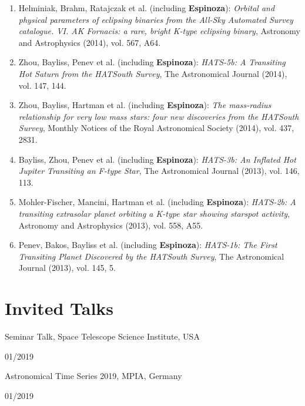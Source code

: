\documentclass[12pt, a4paper]{article} %
\begin{document}
\begin{flushleft}
\begin{enumerate}
\item Helminiak, Brahm, Ratajczak et al. (including \textbf{Espinoza}): \textit{Orbital and physical parameters of eclipsing binaries from the All-Sky Automated Survey catalogue. VI. AK Fornacis: a rare, bright K-type eclipsing binary}, Astronomy and Astrophysics (2014), vol. 567, A64.
\item Zhou, Bayliss, Penev et al. (including \textbf{Espinoza}): \textit{HATS-5b: A Transiting Hot Saturn from the HATSouth Survey}, The Astronomical Journal (2014), vol. 147, 144.
\item Zhou, Bayliss, Hartman et al. (including \textbf{Espinoza}): \textit{The mass-radius relationship for very low mass stars: four new discoveries from the HATSouth Survey}, Monthly Notices of the Royal Astronomical Society (2014), vol. 437, 2831.
\item Bayliss, Zhou, Penev et al. (including \textbf{Espinoza}): \textit{HATS-3b: An Inflated Hot Jupiter Transiting an F-type Star}, The Astronomical Journal (2013), vol. 146, 113.
\item Mohler-Fischer, Mancini, Hartman et al. (including \textbf{Espinoza}): \textit{HATS-2b: A transiting extrasolar planet orbiting a K-type star showing starspot activity}, Astronomy and Astrophysics (2013), vol. 558, A55.
\item Penev, Bakos, Bayliss et al. (including \textbf{Espinoza}): \textit{HATS-1b: The First Transiting Planet Discovered by the HATSouth Survey}, The Astronomical Journal (2013), vol. 145, 5.
\end{enumerate}
\end{flushleft}



\section*{Invited Talks}

\begin{minipage}[t]{0.7\textwidth}
\begin{flushleft}%
  \setlength{\leftskip}{0.2cm}%
Seminar Talk, Space Telescope Science Institute, USA
\end{flushleft}
\end{minipage}
\begin{minipage}[t]{0.3\textwidth}
\hfill 01/2019
\end{minipage}

\begin{minipage}[t]{0.7\textwidth}
\begin{flushleft}%
  \setlength{\leftskip}{0.2cm}%
Astronomical Time Series 2019, MPIA, Germany
\end{flushleft}
\end{minipage}
\begin{minipage}[t]{0.3\textwidth}
\hfill 01/2019
\end{minipage}
\end{document}
